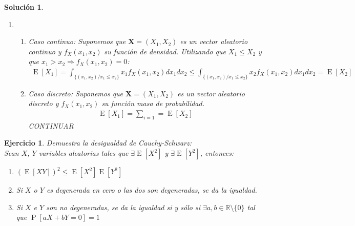 \documentclass[
  a4paper,
  spanish,
  12pt,
]{scrartcl}
\theoremstyle{ejercicio-style}
\newtheorem{ejer}{Ejercicio}
\theoremstyle{remark-style}
\newtheorem*{sol}{Solución}
\begin{document}
\begin{sol}
\begin{enumerate}
  \item
  	\begin{enumerate}
  	  \item Caso continuo: Suponemos que \(\symbf{X} = (X_1, X_2)\) es un vector aleatorio continuo y \(f_X(x_1, x_2)\) su función de densidad. Utilizando que \(X_1 \leq X_2\) y que \(x_1 > x_2 \Rightarrow f_X(x_1, x_2) = 0\):
  	    \begin{align*}
  	      \operatorname{E}[X_1] = \int_{\{(x_1, x_2) / x_1 \leq x_2\}} x_1 f_X (x_1, x_2) dx_1 dx_2 \leq \int_{\{(x_1, x_2) / x_1 \leq x_2\}} x_2 f_X (x_1, x_2) dx_1 dx_2 = \operatorname{E}[X_2]
  	    \end{align*}
  	  	
  	  \item Caso discreto: Suponemos que \(\symbf{X} = (X_1, X_2)\) es un vector aleatorio discreto y \(f_X(x_1, x_2)\) su función masa de probabilidad.
  	     \begin{align*}
  	      \operatorname{E}[X_1] = \sum_{i=1} = \operatorname{E}[X_2]
  	    \end{align*}
  	    CONTINUAR
  	  	
  	\end{enumerate}
  \end{enumerate}
\end{sol}





\begin{ejer}
  Demuestra la desigualdad de Cauchy-Schwarz: \\
  Sean \(X\), \(Y\) variables aleatorias tales que \(\exists \operatorname{E}[X^2]\) y \(\exists \operatorname{E}[Y^2]\), entonces:
  \begin{enumerate}
     \item \((\operatorname{E}[XY])^2 \leq \operatorname{E}[X^2] \operatorname{E}[Y^2]\)
     
     \item Si \(X\) o \(Y\) es degenerada en cero o las dos son degeneradas, se da la igualdad.
     
     \item Si \(X\) e \(Y\) son no degeneradas, se da la igualdad si y sólo si \(\exists a,b \in \mathbb{R}\setminus\{0\}\) tal que \(\operatorname{P}[aX+bY=0] = 1\)
  \end{enumerate}
\end{ejer}
\end{document}
